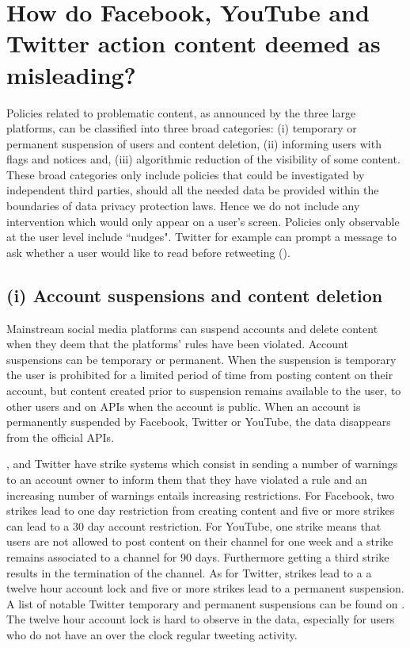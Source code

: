 \documentclass[Afour,sageh,times]{sagej}
\begin{document}
\section{How do Facebook, YouTube and Twitter action content deemed as misleading?}

Policies related to problematic content, as announced by the three large platforms, can be classified into three broad categories: (i) temporary or permanent suspension of users and content deletion, (ii) informing users with flags and notices and, (iii) algorithmic reduction of the visibility of some content. 
These broad categories only include policies that could be investigated by independent third parties, should all the needed data be provided within the boundaries of data privacy protection laws. Hence we do not include any intervention which would only appear on a user's screen. 
Policies only observable at the user level include ``nudges". 
Twitter for example can prompt a message to ask whether a user would like to read before retweeting (\cite{twittersafetynudge}). 

\subsection{(i) Account suspensions and content deletion}

Mainstream social media platforms can suspend accounts and delete content when they deem that the platforms' rules have been violated. Account suspensions can be temporary or permanent.  
When the suspension is temporary the user is prohibited for a limited period of time from posting content on their account, but  content created prior to suspension remains available to the user, to other users and on APIs when the account is public.  
When an account is permanently suspended by Facebook, Twitter or YouTube, the data disappears from the official APIs. 

\cite{facebookstrikes}, \cite{youtubestrikes} and Twitter have strike systems which consist in sending a number of warnings to an account owner to inform them that they have violated a rule and an increasing number of warnings entails increasing restrictions. For Facebook, two strikes lead to one day restriction from creating content and five or more strikes can lead to a $30$ day account restriction. For YouTube, one strike means that users are not allowed to post content on their channel for one week and a strike remains associated to a channel for 90 days. Furthermore getting a third strike results in the termination of the channel. As for Twitter, strikes lead to a a twelve hour account lock and five or more strikes lead to a permanent suspension. A list of notable Twitter temporary and permanent suspensions can be found on \cite{twittersuspensions}. The twelve hour account lock is hard to observe in the data, especially for users who do not have an over the clock regular tweeting activity.
\end{document}
